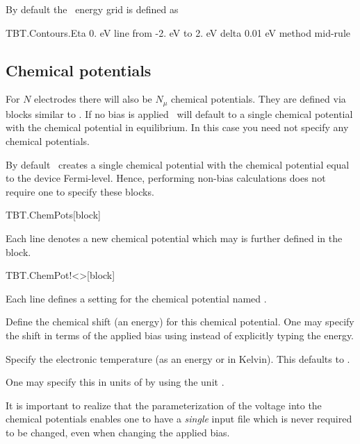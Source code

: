 By default the \tbtrans\ energy grid is defined as
\begin{fdfexample}
  TBT.Contours.Eta 0. eV
    line
     from -2. eV to 2. eV
      delta 0.01 eV
        method mid-rule
\end{fdfexample}


\subsection{Chemical potentials}


For $N$ electrodes there will also be $N_\mu$ chemical
potentials. They are defined via blocks similar to .
If no bias is applied \tbtrans\ will default to a single chemical
potential with the chemical potential in equilibrium. In this case you
need not specify any chemical potentials.

By default \tbtrans\ creates a single chemical potential with the
chemical potential equal to the device Fermi-level. Hence, performing
non-bias calculations does not require one to specify these blocks.

\begin{fdfentry}{TBT.ChemPots}[block]
  
  Each line denotes a new chemical potential which may is further
  defined in the  block.
  
\end{fdfentry}

\begin{fdfentry}{TBT.ChemPot!<>}[block]

  Each line defines a setting for the chemical potential named
  \fdf*{<>}.

  \begin{fdfoptions}
    

    Define the chemical shift (an energy) for this chemical
    potential. One may specify the shift in terms of the applied bias
    using  instead of explicitly typing the energy.


    Specify the electronic temperature (as an energy or in
    Kelvin). This defaults to .

    One may specify this in units of  by
    using the unit .

  \end{fdfoptions}

  It is important to realize that the parameterization of the voltage
  into the chemical potentials enables one to have a \emph{single}
  input file which is never required to be changed, even when changing
  the applied bias.

\end{fdfentry}

